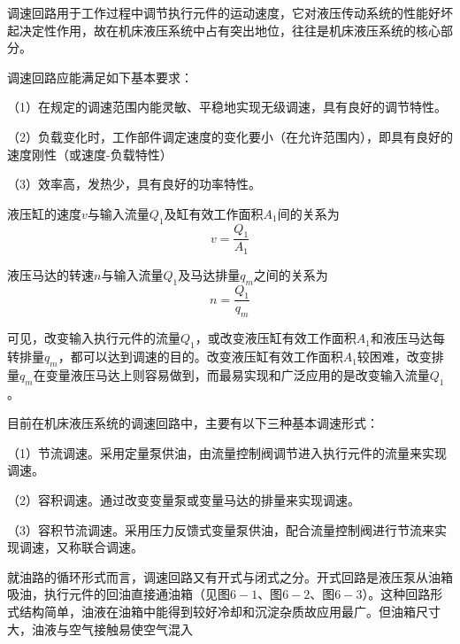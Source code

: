 调速回路用于工作过程中调节执行元件的运动速度，它对液压传动系统的性能好坏起决定性作用，故在机床液压系统中占有突出地位，往往是机床液压系统的核心部分。

调速回路应能满足如下基本要求：

（1）在规定的调速范围内能灵敏、平稳地实现无级调速，具有良好的调节特性。

（2）负载变化时，工作部件调定速度的变化要小（在允许范围内），即具有良好的速度刚性（或速度-负载特性）

（3）效率高，发热少，具有良好的功率特性。

液压缸的速度$v$与输入流量$Q_{1}$及缸有效工作面积$A_{1}$间的关系为
\[
v = \frac {Q_{1}} {A_{1}}
\]

液压马达的转速$n$与输入流量$Q_{1}$及马达排量$q_{m}$之间的关系为
\[
n = \frac {Q_{1}} {q_{m}}
\]

可见，改变输入执行元件的流量$Q_{1}$，或改变液压缸有效工作面积$A_{1}$和液压马达每转排量$q_{m}$，都可以达到调速的目的。改变液压缸有效工作面积$A_{1}$较困难，改变排量$q_{m}$在变量液压马达上则容易做到，而最易实现和广泛应用的是改变输入流量$Q_{1}$。

目前在机床液压系统的调速回路中，主要有以下三种基本调速形式：

（1）节流调速。采用定量泵供油，由流量控制阀调节进入执行元件的流量来实现调速。

（2）容积调速。通过改变变量泵或变量马达的排量来实现调速。

（3）容积节流调速。采用压力反馈式变量泵供油，配合流量控制阀进行节流来实现调速，又称联合调速。

就油路的循环形式而言，调速回路又有开式与闭式之分。开式回路是液压泵从油箱吸油，执行元件的回油直接通油箱（见图$6-1$、图$6-2$、图$6-3$）。这种回路形式结构简单，油液在油箱中能得到较好冷却和沉淀杂质故应用最广。但油箱尺寸大，油液与空气接触易使空气混入















